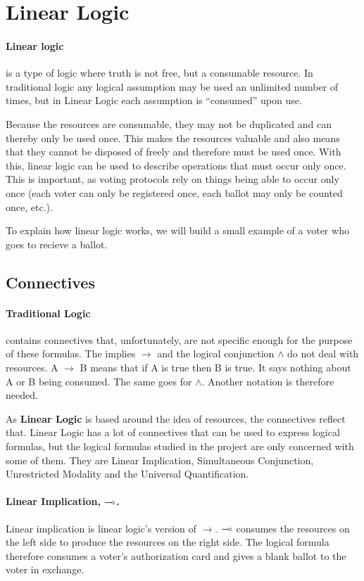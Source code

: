 \section{Linear Logic}
\label{03_01}

\paragraph{Linear logic} is a type of logic where truth is not free, but a consumable resource. In traditional logic any logical assumption may be used an unlimited number of times, but in Linear Logic each assumption is “consumed” upon use.

Because the resources are consumable, they may not be duplicated and can thereby only be used once. This makes the resources valuable and also means that they cannot be disposed of freely and therefore must be used once. With this, linear logic can be used to describe operations that must occur only once. This is important, as voting protocols rely on things being able to occur only once (each voter can only be registered once, each ballot may only be counted once, etc.).

To explain how linear logic works, we will build a small example of a voter who goes to recieve a ballot.

\subsection{Connectives}
\label{03_01_01}

\paragraph{Traditional Logic} contains connectives that, unfortunately, are not specific enough for the purpose of these formulas. The implies $\rightarrow$ and the logical conjunction $\wedge$ do not deal with resources. A $\rightarrow$ B means that if A is true then B is true. It says nothing about A or B being consumed. The same goes for $\wedge$. Another notation is therefore needed. 

As \textbf{Linear Logic} is based around the idea of resources, the connectives reflect that. Linear Logic has a lot of connectives that can be used to express logical formulas, but the logical formulas studied in the project are only concerned with some of them. They are Linear Implication, Simultaneous Conjunction, Unrestricted Modality and the Universal Quantification.

\paragraph{Linear Implication, $\multimap$.} Linear implication is linear logic’s version of $\rightarrow$. $\multimap$ consumes the resources on the left side to produce the resources on the right side. The logical formula
therefore consumes a voter’s authorization card and gives a blank ballot to the voter in exchange.

